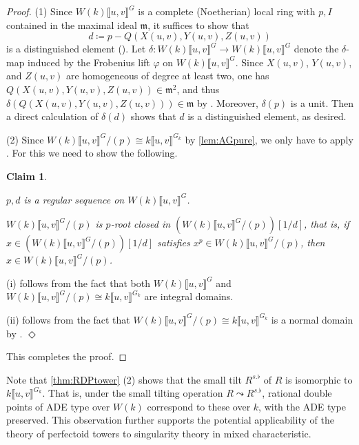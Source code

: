 \documentclass[uplatex,11pt,a4paper]{amsart} %
\numberwithin{equation}{section}
\numberwithin{figure}{section}
\numberwithin{table}{section}
\theoremstyle{plain}
\newtheorem{claim}[theorem]{Claim}
\theoremstyle{definition}
\newenvironment{pfclaim}[1][$\Diamond$]
{\def\claimQED{{#1}}\noindent {\em Proof of the claim. }}
{\leavevmode\unskip\penalty9999 \hbox{}\nobreak\hfill
    \quad\hbox{\claimQED}{\smallskip}}
\newcommand{\m}{\mathfrak{m}}
\begin{document}
\begin{proof}
(1) Since $W(k)\llbracket u,v\rrbracket^G$ is a complete (Noetherian) local ring with $p,I$ contained in the maximal ideal $\m$, it suffices to show that
\[
d\coloneqq p-Q(X(u,v),Y(u,v),Z(u,v))
\]
is a distinguished element (\cite[Lemma 2.25]{BS22}). Let $\delta\colon W(k)\llbracket u,v\rrbracket^G\to W(k)\llbracket u,v\rrbracket^G$ denote the $\delta$-map induced by the Frobenius lift $\varphi$ on $W(k)\llbracket u,v\rrbracket^G$. Since $X(u,v)$, $Y(u,v)$, and $Z(u,v)$ are homogeneous of degree at least two, one has $Q(X(u,v),Y(u,v),Z(u,v))\in \m^2$, and thus $\delta(Q(X(u,v),Y(u,v),Z(u,v))) \in \m$ by \cite[Lemma 3.3]{IN26}. Moreover, $\delta(p)$ is a unit. Then a direct calculation of $\delta(d)$ shows that $d$ is a distinguished element, as desired.

(2) Since $W(k)\llbracket u,v\rrbracket^G/(p) \cong k\llbracket u,v\rrbracket^{G_k}$ by \cref{lem:AGpure}, we only have to apply \cite[Theorem~4.5]{Ish26}. For this we need to show the following.

\begin{claim}
  \begin{enumroman}
  \item $p,d$ is a regular sequence on $W(k)\llbracket u,v\rrbracket^G$.
  \item $W(k)\llbracket u,v\rrbracket^G/(p)$ is $p$-root closed in $(W(k)\llbracket u,v\rrbracket^G/(p))[1/d]$, that is, if $x\in (W(k)\llbracket u,v\rrbracket^G/(p))[1/d]$ satisfies $x^p\in W(k)\llbracket u,v\rrbracket^G/(p)$, then $x\in W(k)\llbracket u,v\rrbracket^G/(p)$.
  \end{enumroman}
\end{claim}

\begin{pfclaim}
(i) follows from the fact that both $W(k)\llbracket u,v\rrbracket^G$ and $W(k)\llbracket u,v\rrbracket^G/(p)\cong k\llbracket u,v\rrbracket^{G_k}$ are integral domains.

(ii) follows from the fact that $W(k)\llbracket u,v\rrbracket^G/(p)\cong k\llbracket u,v\rrbracket^{G_k}$ is a normal domain by \cite[Proposition 6.4.1]{BH}.
\end{pfclaim}

This completes the proof.
\end{proof}

Note that \cref{thm:RDPtower} (2) shows that the small tilt $R^{s.\flat}$ of $R$ is isomorphic to $k\llbracket u,v\rrbracket^{G_k}$. That is, under the small tilting operation $R\leadsto R^{s.\flat}$, rational double points of ADE type over $W(k)$ correspond to these over $k$, with the ADE type preserved. This observation further supports the potential applicability of the theory of perfectoid towers to singularity theory in mixed characteristic.
\end{document}
